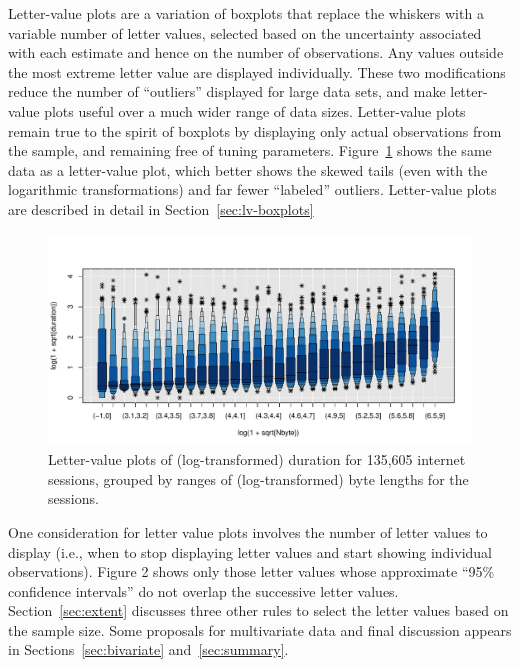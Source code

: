 \documentclass[12pt,oneside]{article}
\begin{document}
Letter-value plots are a variation of boxplots that replace the whiskers with
a variable number of letter values, selected based on the uncertainty
associated with each estimate and hence on the number of observations. Any
values outside the most extreme letter value are displayed individually. These
two modifications reduce the number of ``outliers'' displayed for large data
sets, and make letter-value plots useful over a much wider range of data
sizes. Letter-value plots remain true to the spirit of boxplots by displaying
only actual observations from the sample, and remaining free of tuning
parameters. Figure~\ref{fig:internet-lbp} shows the same data as a
letter-value plot, which better shows the skewed tails (even with the
logarithmic transformations) and far fewer ``labeled'' outliers. Letter-value
plots are described in detail in Section~\ref{sec:lv-boxplots}

\begin{figure}[hbtp]
  \centering
  \includegraphics[width=\linewidth]{lvbox2}

  \caption{Letter-value plots of (log-transformed) duration for 135,605
  internet sessions, grouped by ranges of (log-transformed) byte lengths for
  the sessions.}

  \label{fig:internet-lbp} 
\end{figure}

One consideration for letter value plots involves the number of letter values to display (i.e., when to stop displaying letter values and start showing individual observations). Figure 2 shows only those letter values whose approximate ``95\% confidence intervals'' do not overlap the successive letter values. Section~\ref{sec:extent} discusses three other rules to select the letter values based on the sample size. Some proposals for multivariate data and final discussion appears in Sections~\ref{sec:bivariate} and~\ref{sec:summary}.
\end{document}
